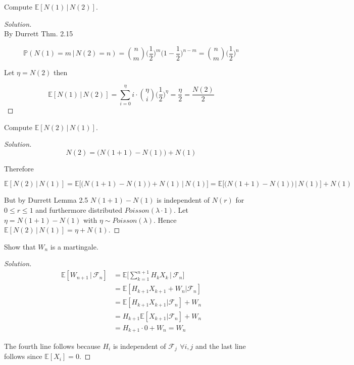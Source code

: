 \documentclass[12pt]{article}
\newenvironment{problem}[2][Problem]{\begin{trivlist}
\item[\hskip \labelsep {\bfseries #1}\hskip \labelsep {\bfseries #2.}]}{\end{trivlist}}
\newenvironment{solution}
  {\begin{proof}[Solution]\renewcommand{\qedsymbol}{}}
  {\end{proof}}
\begin{document}
\begin{problem}{4(a)}
Compute $\mathbb{E}[N(1) \, | \, N(2)]$.
\end{problem}
\begin{solution}\ \\

By Durrett Thm. 2.15 

$$\mathbb{P}(N(1) = m \, | \, N(2) = n ) = {n \choose m} \bigg(\frac{1}{2}\bigg)^m\bigg(1-\frac{1}{2}\bigg)^{n-m} = {n \choose m} \bigg(\frac{1}{2}\bigg)^n
$$  

Let $\eta = N(2)$ then

$$\mathbb{E}[N(1) \, | \, N(2)] =\sum_{i=0}^\eta i\cdot {\eta \choose i} \bigg(\frac{1}{2}\bigg)^\eta = \frac{\eta}{2} = \frac{N(2)}{2}
$$

\end{solution}

\begin{problem}{4(b)}
Compute $\mathbb{E}[N(2) \, | \, N(1)]$.
\end{problem}
\begin{solution}\ \\

$$N(2) =\bigg(N(1+1) - N(1)\bigg) + N(1)$$

Therefore

$$\mathbb{E}[N(2) \, | \, N(1)] = \mathbb{E}\bigg[\bigg(N(1+1) - N(1)\bigg) + N(1) \, \bigg| \, N(1)\bigg] =  \mathbb{E}\bigg[\bigg(N(1+1) - N(1)\bigg) \, \bigg| \, N(1)\bigg] + N(1)$$

But by Durrett Lemma 2.5 $N(1+1) - N(1)$ is independent of $N(r)$ for $0 \leq r \leq 1$ and furthermore distributed $Poisson(\lambda \cdot 1)$. Let $\eta =N(1+1) - N(1)$ with $\eta \sim Poisson(\lambda)$.  Hence $\mathbb{E}[N(2) \, | \, N(1)] = \eta + N(1)$.
\end{solution}

\begin{problem}{5(a)}
Show that $W_n$ is a martingale.
\end{problem}
\begin{solution}\ \\

\begin{align*}
\mathbb{E}[W_{n+1} \, | \, \mathcal{F}_n] &= \mathbb{E}\bigg[\sum_{k=1}^{n+1} H_k X_k \,\bigg | \, \mathcal{F}_n\bigg] \\
&= \mathbb{E}[H_{k+1}X_{k+1} + W_n | \mathcal{F}_n] \\
&=  \mathbb{E}[H_{k+1}X_{k+1} | \mathcal{F}_n] + W_n \\
&= H_{k+1} \mathbb{E}[X_{k+1} | \mathcal{F}_n] + W_n \\
&= H_{k+1} \cdot 0 + W_n = W_n
\end{align*}

The fourth line follows because $H_i$ is independent of $\mathcal{F}_j \,~ \forall i,j$ and the last line follows since $\mathbb{E}[X_i] = 0$.
\end{solution}
\end{document}
